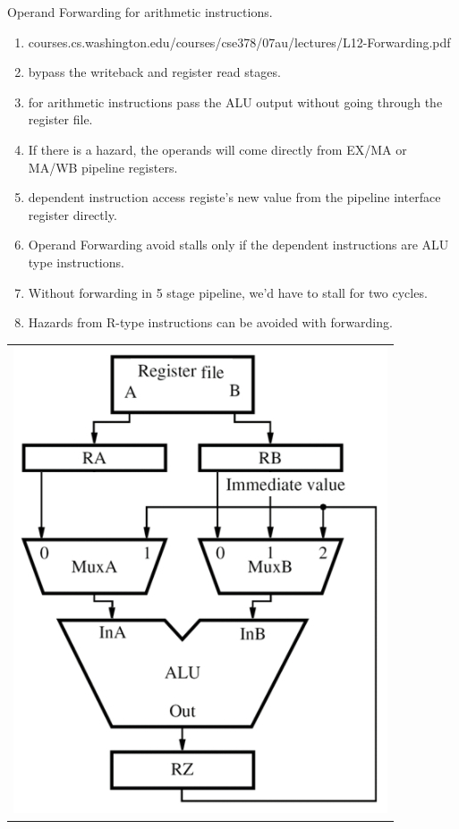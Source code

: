 \begin{enumerate}
\begin{minipage}{\linewidth}
    \newpage

    \item Operand Forwarding for arithmetic instructions.
    \begin{enumerate}
        \item courses.cs.washington.edu/courses/cse378/07au/lectures/L12-Forwarding.pdf
        \item bypass the writeback and register read stages.
        \item for arithmetic instructions pass the ALU output without going through the register file.
        \item If there is a hazard, the operands will come directly from EX/MA or MA/WB pipeline registers.
        \item dependent instruction access registe's new value from the pipeline interface register directly.
        \item Operand Forwarding avoid stalls only if the dependent instructions are ALU type instructions.
        \item Without forwarding in 5 stage pipeline, we’d have to stall for two cycles.
        \item Hazards from R-type instructions can be avoided with forwarding.
    \end{enumerate}

    \begin{center}
    \begin{myTableStyle} \begin{tabular}{ c }
               \includegraphics[scale=0.7]{./images/oprand_forwarding.jpeg}  \\
    \end{tabular} \end{myTableStyle} \vspace{0.08in}
    \end{center}
    \end{minipage}


\end{enumerate}
